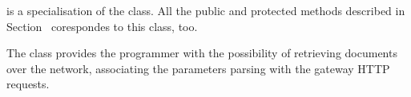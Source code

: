 \documentclass{ozdoc}
\begin{document}



 is a specialisation of the  class. All the public and protected methods described in Section~ corespondes to this class, too.

The  class provides the programmer with the possibility of retrieving documents over the network, associating the parameters parsing with the gateway  HTTP requests. \mozartEMPTY
 \mozartEMPTY
\end{document}
